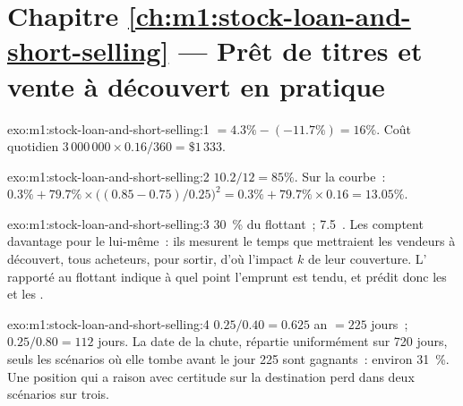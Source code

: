 \section*{Chapitre \ref{ch:m1:stock-loan-and-short-selling} --- Prêt de titres et vente à découvert en pratique}

\begin{solution}{exo:m1:stock-loan-and-short-selling:1}
 $= 4.3\% - (-11.7\%) = 16\%$. Coût quotidien $3\,000\,000 \times 0.16/360 =
\$1\,333$.
\end{solution}

\begin{solution}{exo:m1:stock-loan-and-short-selling:2}
 $10.2/12 = 85\%$. Sur la courbe~: $0.3\% + 79.7\% \times
\bigl((0.85-0.75)/0.25\bigr)^2 = 0.3\% + 79.7\% \times 0.16 = 13.05\%$.
\end{solution}

\begin{solution}{exo:m1:stock-loan-and-short-selling:3}
30~\% du flottant~; 7.5~. Les  comptent davantage pour
le  lui-même~: ils mesurent le temps que mettraient les vendeurs à découvert, tous acheteurs, pour
sortir, d'où l'impact $k$ de leur couverture. L' rapporté au flottant
indique à quel point l'emprunt est tendu, et prédit donc les  et les .
\end{solution}

\begin{solution}{exo:m1:stock-loan-and-short-selling:4}
$0.25/0.40 = 0.625$ an $= 225$ jours~; $0.25/0.80 = 112$ jours. La date
de la chute, répartie uniformément sur 720 jours, seuls les scénarios où elle tombe
avant le jour 225 sont gagnants~: environ 31~\%. Une position qui a raison avec certitude sur la
destination perd dans deux scénarios sur trois.
\end{solution}

